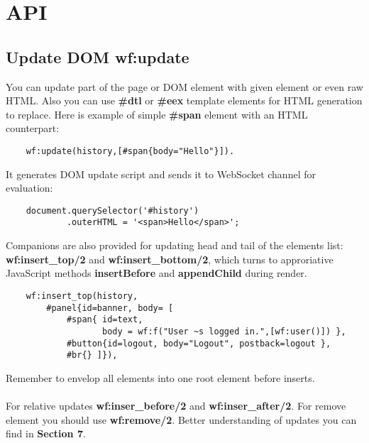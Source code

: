 \section{API}

\subsection{Update DOM \bf{wf:update}}
You can update part of the page or DOM element with given
element or even raw HTML. Also you can use {\bf \#dtl}
or {\bf \#eex} template elements for HTML generation to
replace. Here is example of simple {\bf \#span} element
with an HTML counterpart:

\vspace{1\baselineskip}
\begin{lstlisting}
    wf:update(history,[#span{body="Hello"}]).
\end{lstlisting}
\vspace{1\baselineskip}

It generates DOM update script and sends it to
WebSocket channel for evaluation:

\vspace{1\baselineskip}
\begin{lstlisting}
    document.querySelector('#history')
            .outerHTML = '<span>Hello</span>';
\end{lstlisting}
\vspace{1\baselineskip}

Companions are also provided for updating head and tail
of the elements list: {\bf wf:insert\_top/2} and
{\bf wf:insert\_bottom/2}, which turns to approriative
JavaScript methods {\bf insertBefore} and {\bf appendChild} during render.

\vspace{1\baselineskip}
\begin{lstlisting}
    wf:insert_top(history,
        #panel{id=banner, body= [
            #span{ id=text, 
                   body = wf:f("User ~s logged in.",[wf:user()]) },
            #button{id=logout, body="Logout", postback=logout }, 
            #br{} ]}),
\end{lstlisting}
\vspace{1\baselineskip}

Remember to envelop all elements into one root element before inserts.

\paragraph{}
For relative updates {\bf wf:inser\_before/2} and {\bf wf:inser\_after/2}.
For remove element you should use {\bf wf:remove/2}.
Better understanding of updates you can find in {\bf Section 7}.

